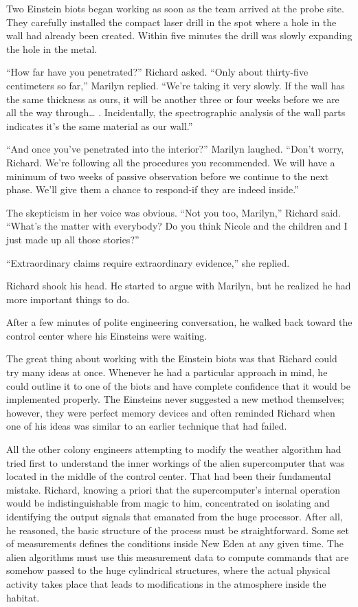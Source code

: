 \documentclass[]{article}
\begin{document}
{Two Einstein biots began working as soon as the team arrived at the probe site.  They carefully installed the compact laser drill in the spot where a hole in the wall had already been created.  Within five minutes the drill was slowly expanding the hole in the metal.

“How far have you penetrated?” Richard asked.  “Only about thirty-five centimeters so far,” Marilyn replied.  “We’re taking it very slowly.  If the wall has the same thickness as ours, it will be another three or four weeks before we are all the way through… .  Incidentally, the spectrographic analysis of the wall parts indicates it’s the same material as our wall.”

“And once you’ve penetrated into the interior?” Marilyn laughed.  “Don’t worry, Richard.  We’re following all the procedures you recommended.  We will have a minimum of two weeks of passive observation before we continue to the next phase.  We’ll give them a chance to respond-if they are indeed inside.”

The skepticism in her voice was obvious.  “Not you too, Marilyn,” Richard said.  “What’s the matter with everybody? Do you think Nicole and the children and I just made up all those stories?”

“Extraordinary claims require extraordinary evidence,” she replied.

Richard shook his head.  He started to argue with Marilyn, but he realized he had more important things to do.

After a few minutes of polite engineering conversation, he walked back toward the control center where his Einsteins were waiting.

The great thing about working with the Einstein biots was that Richard could try many ideas at once.  Whenever he had a particular approach in mind, he could outline it to one of the biots and have complete confidence that it would be implemented properly.  The Einsteins never suggested a new method themselves; however, they were perfect memory devices and often reminded Richard when one of his ideas was similar to an earlier technique that had failed.

All the other colony engineers attempting to modify the weather algorithm had tried first to understand the inner workings of the alien supercomputer that was located in the middle of the control center.  That had been their fundamental mistake.  Richard, knowing a priori that the supercomputer’s internal operation would be indistinguishable from magic to him, concentrated on isolating and identifying the output signals that emanated from the huge processor.  After all, he reasoned, the basic structure of the process must be straightforward.  Some set of measurements defines the conditions inside New Eden at any given time.  The alien algorithms must use this measurement data to compute commands that are somehow passed to the huge cylindrical structures, where the actual physical activity takes place that leads to modifications in the atmosphere inside the habitat.

}
\end{document}
